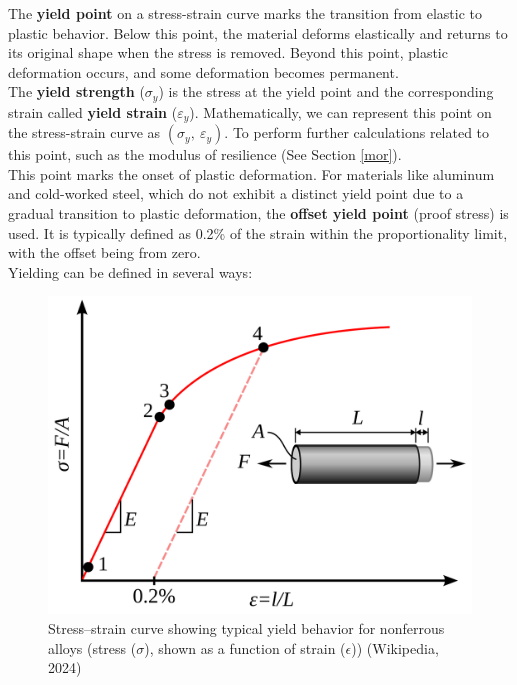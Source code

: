 \documentclass{article}
\begin{document}
{ The \textbf{yield point} on a stress-strain curve marks the transition from elastic to plastic behavior. Below this point, the material deforms elastically and returns to its original shape when the stress is removed. Beyond this point, plastic deformation occurs, and some deformation becomes permanent.\\[8pt]
 The \textbf{yield strength} (\( \sigma_y \)) is the stress at the yield point and the corresponding strain called \textbf{yield strain} (\( \varepsilon_y \)). Mathematically, we can represent this point on the stress-strain curve as \( (\sigma_y,\ \varepsilon_y) \). To perform further calculations related to this point, such as the modulus of resilience (See Section \ref{mor}).\\[8pt]
This point marks the onset of plastic deformation. For materials like aluminum and cold-worked steel, which do not exhibit a distinct yield point due to a gradual transition to plastic deformation, the \textbf{offset yield point} (proof stress) is used. It is typically defined as 0.2\% of the strain within the proportionality limit, with the offset being from zero.\\[8pt] 
Yielding can be defined in several ways:\\
\begin{minipage}{0.4\textwidth}
     \begin{figure}[H]
     \centering
     \includegraphics[width=1\textwidth]{images/Metal_yield.png}
     \caption{Stress–strain curve showing typical yield behavior for nonferrous alloys (stress (\(\sigma\)), shown as a function of strain (\(\epsilon\))) (Wikipedia, 2024)}

\end{figure}
\end{minipage}}
\end{document}
